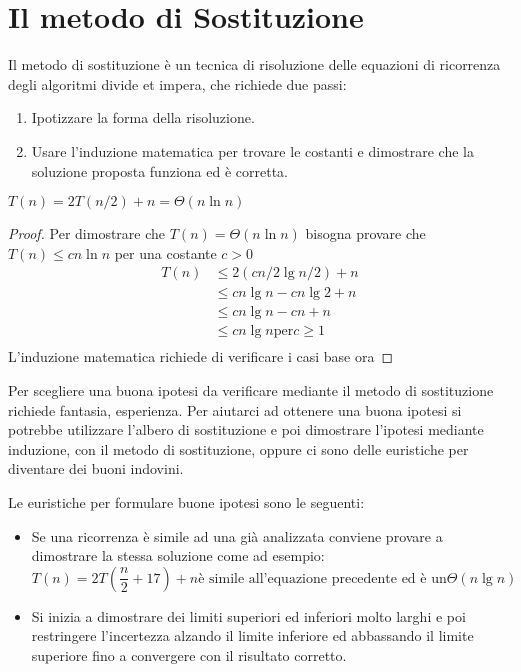 \section{Il metodo di Sostituzione}
Il metodo di sostituzione è un tecnica di risoluzione delle equazioni di ricorrenza
degli algoritmi divide et impera, che richiede due passi:
\begin{enumerate}
    \item Ipotizzare la forma della risoluzione.
    \item Usare l'induzione matematica per trovare le costanti e dimostrare che
          la soluzione proposta funziona ed è corretta.
\end{enumerate}

\begin{thm}
    $T(n) = 2T(n/2) + n = \Theta(n \ln n)$
\end{thm}
\begin{proof}
Per dimostrare che $T(n) = \Theta(n \ln n)$ bisogna provare che $T(n) \leq cn \ln n$ per una costante $c > 0$
\begin{equation*}
\begin{split}
T(n) & \leq 2(cn/2 \lg n/2) + n \\
     & \leq cn \lg n - cn \lg 2 + n\\
     & \leq cn \lg n - cn + n \\
     & \leq cn \lg n \text{per} c \geq 1\\
\end{split}
\end{equation*}
L'induzione matematica richiede di verificare i casi base ora
\end{proof}

Per scegliere una buona ipotesi da verificare mediante il metodo di sostituzione
richiede fantasia, esperienza.
Per aiutarci ad ottenere una buona ipotesi si potrebbe utilizzare l'albero di sostituzione
e poi dimostrare l'ipotesi mediante induzione, con il metodo di sostituzione, oppure
ci sono delle euristiche per diventare dei buoni indovini.

Le euristiche per formulare buone ipotesi sono le seguenti:
\begin{itemize}
    \item Se una ricorrenza è simile ad una già analizzata conviene provare a dimostrare
          la stessa soluzione come ad esempio:
          \begin{equation*}
              T(n) = 2T(\frac{n}{2} + 17) + n \text{è simile all'equazione precedente ed è un} \Theta(n \lg n)
          \end{equation*}
    \item Si inizia a dimostrare dei limiti superiori ed inferiori molto larghi e
          poi restringere l'incertezza alzando il limite inferiore ed abbassando
          il limite superiore fino a convergere con il risultato corretto.
\end{itemize}

